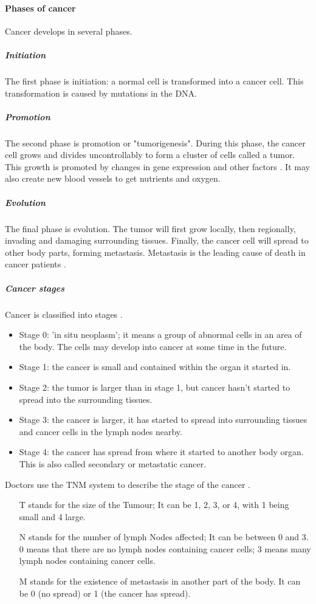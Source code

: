 \paragraph{Phases of cancer}
Cancer develops in several phases.
\subparagraph{Initiation}
The first phase is initiation: a normal cell is transformed into a cancer cell.
This transformation is caused by mutations in the DNA.
\subparagraph{Promotion}
The second phase is promotion or "tumorigenesis".
During this phase, the cancer cell grows and divides uncontrollably to form a cluster of cells called a tumor.
This growth is promoted by changes in gene expression and other factors \cite{Witsch2010}.
It may also create new blood vessels to get nutrients and oxygen.
\subparagraph{Evolution}
The final phase is evolution.
The tumor will first grow locally, then regionally, invading and damaging surrounding tissues.
Finally, the cancer cell will spread to other body parts, forming metastasis.
Metastasis is the leading cause of death in cancer patients \cite{Steeg2006}.

\subparagraph{Cancer stages}
Cancer is classified into stages \cite{cancerresearchuk2023}.
\begin{itemize}
	\item Stage 0: 'in situ neoplasm'; it means a group of abnormal cells in an area of the body. The cells may develop into cancer at some time in the future.
	\item Stage 1: the cancer is small and contained within the organ it started in.
	\item Stage 2: the tumor is larger than in stage 1, but cancer hasn't started to spread into the surrounding tissues.
	\item Stage 3: the cancer is larger, it has started to spread into surrounding tissues and cancer cells in the lymph nodes nearby.
	\item Stage 4: the cancer has spread from where it started to another body organ. This is also called secondary or metastatic cancer.
\end{itemize}
Doctors use the TNM system to describe the stage of the cancer \cite{Brierley2016}.
\begin{itemize}
	\item [T] stands for the size of the Tumour;
	It can be 1, 2, 3, or 4, with 1 being small and 4 large.
	\item [N] stands for the number of lymph Nodes affected;
	It can be between 0 and 3.
	0 means that there are no lymph nodes containing cancer cells; 3 means many lymph nodes containing cancer cells.
	\item [M] stands for the existence of metastasis in another part of the body.
	It can be 0 (no spread) or 1 (the cancer has spread).
\end{itemize}

